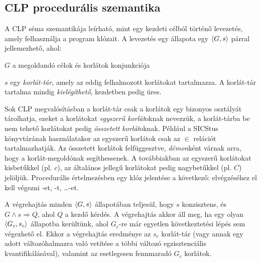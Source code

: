 \subsection{CLP procedurális szemantika}

A CLP séma szemantikája leírható, mint egy kezdeti célból történő levezetés,
amely felhasználja a program klózait. A levezetés egy állapota egy
$\left\langle G,s\right\rangle$ párral jellemezhető, ahol:

\bul
\item $G$ a megoldandó célok és korlátok konjunkciója
\item $s$ egy \emph{korlát-tár}, amely az eddig felhalmozott korlátokat
tartalmazza. A korlát-tár tartalma mindig \emph{kielégíthető}, kezdetben
pedig üres.
\eul

Sok CLP megvalósításban a korlát-tár csak a korlátok egy bizonyos osztályát
tárolhatja, ezeket a korlátokat \emph{egyszerű korlát}oknak nevezzük,
a korlát-tárba be nem tehető korlátokat pedig \emph{összetett korlát}oknak.
Például a SICStus \clpfd könyvtárának használatakor az egyszerű korlátok csak az
$\in$ relációt tartalmazhatják. Az összetett korlátok felfüggesztve,
\emph{démon}ként várnak arra, hogy a korlát-megoldónak segíthessenek.
A továbbiakban az egyszerű korlátokat kisbetűkkel (pl. $c$), az általános
jellegű korlátokat pedig nagybetűkkel (pl. $C$) jelöljük.
\br
Procedurális értelmezésben egy  klóz jelentése
a következő:  elvégzéséhez el kell végezni -et, -t,
\dots {}-et.

A végrehajtás minden $\left\langle G,s\right\rangle$ állapotában teljesül, hogy $s$ konzisztens,
és $G \land s \Rightarrow Q$, ahol $Q$ a kezdő kérdés. A végrehajtás akkor áll meg, ha
egy olyan $\left\langle G_c,s_c\right\rangle$ állapotba kerültünk, ahol $G_c$-re már egyetlen
következtetési lépés sem végezhető el. Ekkor a végrehajtás eredménye az
$s_c$ korlát-tár (vagy annak egy adott változóhalmazra való vetítése
a többi változó egzisztenciális kvantifikálásával), valamint az esetlegesen
fennmaradó $G_c$ korlátok.

